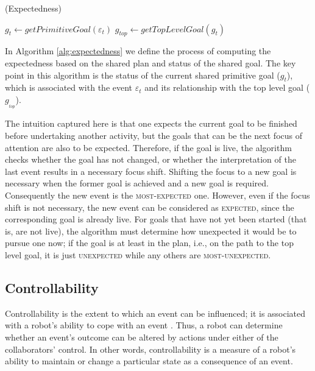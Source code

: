 \documentclass[12pt]{report}
\begin{document}
\begin{algorithm}
	\caption{(Expectedness)}
	\label{alg:expectedness}
	\begin{algorithmic}[1]
			\Statex
			\State $\mathit{g}_{t} \gets \textit{getPrimitiveGoal}{(\varepsilon_t)}$
			\State $\mathit{g}_{top} \gets \textit{getTopLevelGoal}{(\mathit{g}_{t})}$
			\Statex
				\State {}
				\Else
					\State {}
				\EndIf
			\Else
					\State {}
				\Else
					\State {}
				\EndIf
			\EndIf
		\EndFunction
	\end{algorithmic}
\end{algorithm}

In Algorithm \ref{alg:expectedness} we define the process of computing the
expectedness based on the shared plan and status of the shared goal. The key
point in this algorithm is the status of the current shared primitive goal
($\mathit{g}_{t}$), which is associated with the event $\varepsilon_t$ and its
relationship with the top level goal ($\mathit{g}_{_{top}}$).

The intuition captured here is that one expects the current goal to be finished
before undertaking another activity, but the goals that can be the next focus of
attention are also to be expected. Therefore, if the goal is live, the algorithm
checks whether the goal has not changed, or whether the interpretation of the
last event results in a necessary focus shift. Shifting the focus to a new goal
is necessary when the former goal is achieved and a new goal is required.
Consequently the new event is the \textsc{most-expected} one. However, even if
the focus shift is not necessary, the new event can be considered as
\textsc{expected}, since the corresponding goal is already live. For goals that
have not yet been started (that is, are not live), the algorithm must determine
how unexpected it would be to pursue one now; if the goal is at least in the
plan, i.e., on the path to the top level goal, it is just \textsc{unexpected}
while any others are \textsc{most-unexpected}.

\subsection{Controllability}
\label{sec:controllability}
Controllability is the extent to which an event can be influenced; it is
associated with a robot's ability to cope with an event
\cite{gratch:domain-independent}. Thus, a robot can determine whether an event's
outcome can be altered by actions under either of the collaborators' control. In
other words, controllability is a measure of a robot's ability to maintain or
change a particular state as a consequence of an event.
\end{document}
